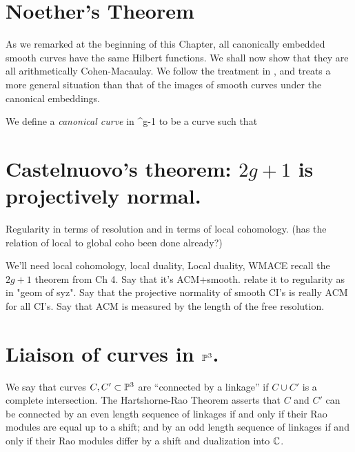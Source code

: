 {\section{Noether's Theorem}\label{sec:canonical curves} 

As we remarked at the beginning of this Chapter, all canonically embedded smooth curves have the same Hilbert functions. We shall now show that they are all arithmetically Cohen-Macaulay.
We follow the treatment in \cite{Schreyer}, and treats a more general situation than that of the 
images of smooth curves under the canonical embeddings.

We define a \emph{canonical curve} in \PP^{g-1} to be a curve such that 
$$

$$

\begin{theorem}

 
\end{theorem}

\section{Castelnuovo's theorem: $2g+1$ is projectively normal.}

 Regularity in terms of resolution and in terms of local cohomology. (has the relation of local to global coho been done already?)

We'll need local cohomology, local duality, 
 Local duality, WMACE
recall the $2g+1$ theorem from Ch 4. Say that it's ACM+smooth. relate it to regularity as in "geom of syz". Say that the projective
normality of smooth CI's is really ACM for all CI's. Say that ACM is measured by the length of the free resolution.


\section{Liaison of curves in $\PP^3$.}

\begin{fact} We say that curves $C,C'\subset \PP^{3}$ are ``connected by a linkage'' if $C\cup C'$
is a complete intersection.
 The Hartshorne-Rao Theorem \cite{} asserts that 
$C$ and $C'$ can be connected by an even length sequence of linkages if and only if their Rao modules are equal up to a shift; and by an odd length sequence of linkages if and only if their Rao modules differ by a shift and dualization into $\CC$.
\end{fact}


}
